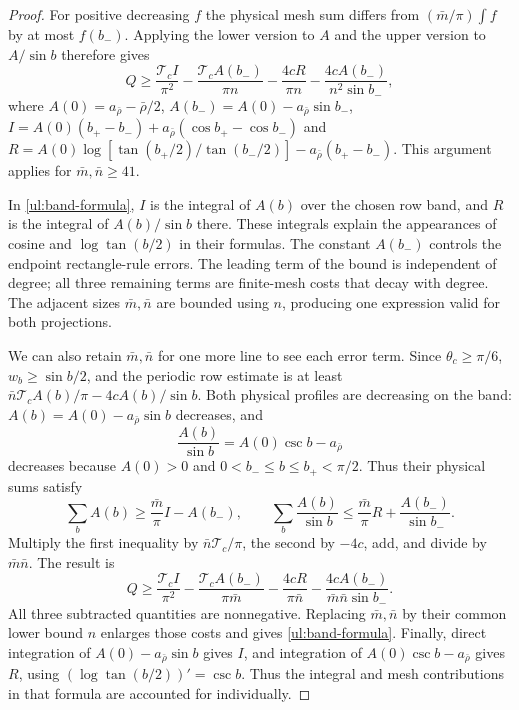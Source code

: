\begin{proof}
For positive decreasing $f$ the physical mesh sum differs from
$(\bar{m}/\pi)\int f$ by at most $f(b_-)$.  Applying the lower version to
$A$ and the upper version to $A/\sin b$ therefore gives
\begin{equation}\label{ul:band-formula}
 Q\geq\frac{\mathcal T_c I}{\pi^2}
       -\frac{\mathcal T_c A(b_-)}{\pi n}
       -\frac{4cR}{\pi n}-\frac{4cA(b_-)}{n^2\sin b_-},
\end{equation}
where $A(0)=a_{\bar{\rho}}-\bar{\rho}/2$, $A(b_-)=A(0)-a_{\bar{\rho}}\sin b_-$,
$I=A(0)(b_+-b_-)+a_{\bar{\rho}}(\cos b_+-\cos b_-)$ and
$R=A(0)\log[\tan(b_+/2)/\tan(b_-/2)]-a_{\bar{\rho}}(b_+-b_-)$.
This argument applies for $\bar{m},\bar{n}\geq41$.

In \eqref{ul:band-formula}, $I$ is the integral of $A(b)$ over the
chosen row band, and $R$ is the integral of $A(b)/\sin b$ there.
These integrals explain the appearances of cosine and
$\log\tan(b/2)$ in their formulas.  The constant $A(b_-)$ controls the
endpoint rectangle-rule errors.  The leading term of the bound is
independent of degree; all three remaining terms are finite-mesh
costs that decay with degree.  The adjacent sizes $\bar{m},\bar{n}$ are bounded
using $n$, producing one expression valid for both projections.

We can also retain $\bar{m},\bar{n}$ for one more line to see each error term.
Since $\theta_c\geq\pi/6$, $w_b\geq\sin b/2$, and the periodic
row estimate is at least
$\bar{n}\mathcal T_cA(b)/\pi-4cA(b)/\sin b$.  Both physical profiles
are decreasing on the band: $A(b)=A(0)-a_{\bar{\rho}}\sin b$ decreases, and
\[
 \frac{A(b)}{\sin b}=A(0)\csc b-a_{\bar{\rho}}
\]
decreases because $A(0)>0$ and $0<b_-\leq b\leq b_+<\pi/2$.
Thus their physical sums satisfy
\[
 \sum_b A(b)\geq\frac {\bar{m}}{\pi} I-A(b_-),
 \qquad
 \sum_b\frac{A(b)}{\sin b}
                 \leq\frac {\bar{m}}{\pi} R+\frac{A(b_-)}{\sin b_-}.
\]
Multiply the first inequality by $\bar{n}\mathcal T_c/\pi$, the
second by $-4c$, add, and divide by $\bar{m}\bar{n}$.  The result is
\[
 Q\geq\frac{\mathcal T_c I}{\pi^2}
       -\frac{\mathcal T_c A(b_-)}{\pi \bar{m}}
       -\frac{4cR}{\pi \bar{n}}
       -\frac{4cA(b_-)}{\bar{m}\bar{n}\sin b_-}.
\]
All three subtracted quantities are nonnegative.  Replacing
$\bar{m},\bar{n}$ by their common lower bound $n$ enlarges those costs and
gives \eqref{ul:band-formula}.  Finally, direct integration of
$A(0)-a_{\bar{\rho}}\sin b$ gives $I$, and integration of
$A(0)\csc b-a_{\bar{\rho}}$ gives $R$, using
$(\log\tan(b/2))'=\csc b$.  Thus the integral and mesh
contributions in that formula are accounted for individually.


\end{proof}

